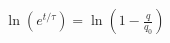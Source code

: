 \documentclass[preview]{standalone}
\begin{document}
\begin{align*}
\ln(e^{t/\tau})=\ln\left( 1-\frac{q}{q_{0}} \right)
\end{align*}
\end{document}
